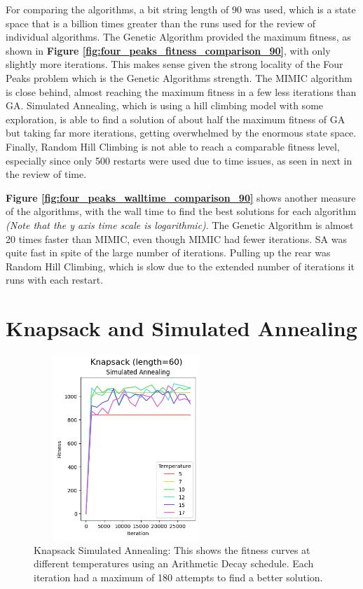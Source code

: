 \documentclass[letterpaper]{article} %
\begin{document}
For comparing the algorithms, a bit string length of 90 was used, which is a state space that is a billion times greater than the runs used for the review of individual algorithms.  The Genetic Algorithm provided the maximum fitness, as shown in \textbf{Figure \ref{fig:four_peaks_fitness_comparison_90}}, with only slightly more iterations.  This makes sense given the strong locality of the Four Peaks problem which is the Genetic Algorithms strength.  The MIMIC algorithm is close behind, almost reaching the maximum fitness in a few less iterations than GA.  Simulated Annealing, which is using a hill climbing model with some exploration, is able to find a solution of about half the maximum fitness of GA but taking far more iterations, getting overwhelmed by the enormous state space.  Finally, Random Hill Climbing is not able to reach a comparable fitness level, especially since only 500 restarts were used due to time issues, as seen in next in the review of time.

\textbf{Figure \ref{fig:four_peaks_walltime_comparison_90}} shows another measure of the algorithms, with the wall time to find the best solutions for each algorithm \emph{(Note that the y axis time scale is logarithmic)}. The Genetic Algorithm is almost 20 times faster than MIMIC, even though MIMIC had fewer iterations.  SA was quite fast in spite of the large number of iterations.  Pulling up the rear was Random Hill Climbing, which is slow due to the extended number of iterations it runs with each restart.

\section{Knapsack and Simulated Annealing}
\begin{figure}[!htb]
\centering
\includegraphics[width=2.75in, height=2.75in]{figures/Knapsack_length=60_Simulated_Annealing_l_60_ma_180_d_arith_t_5__7__10__12__15__17_.png}
\caption{Knapsack Simulated Annealing: This shows the fitness curves at different temperatures using an Arithmetic Decay schedule. Each iteration had a maximum of 180 attempts to find a better solution. }
\label{fig:knapsack_sa}
\end{figure}
\end{document}
